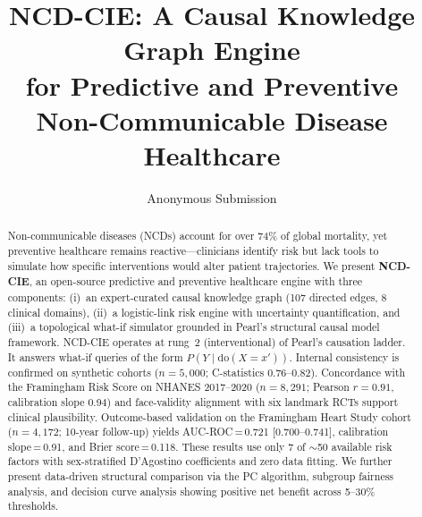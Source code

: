 \documentclass[runningheads]{llncs}
\begin{document}
\title{NCD-CIE: A Causal Knowledge Graph Engine\\for Predictive and Preventive\\Non-Communicable Disease Healthcare}

\author{Anonymous Submission}

\maketitle

\begin{abstract}
Non-communicable diseases (NCDs) account for over 74\% of global
mortality, yet preventive healthcare remains reactive---clinicians
identify risk but lack tools to simulate how specific interventions
would alter patient trajectories.
We present \textbf{NCD-CIE}, an open-source predictive and preventive
healthcare engine with three components:
(i)~an expert-curated causal knowledge graph (107 directed edges,
8 clinical domains),
(ii)~a logistic-link risk engine with uncertainty quantification, and
(iii)~a topological what-if simulator grounded in Pearl's structural
causal model framework.
NCD-CIE operates at rung~2 (interventional) of Pearl's causation
ladder.
It answers what-if queries of the form
$P(Y \mid \mathrm{do}(X\!=\!x'))$.
Internal consistency is confirmed on synthetic cohorts
($n\!=\!5{,}000$; C-statistics 0.76--0.82).
Concordance with the Framingham Risk Score on NHANES 2017--2020
($n\!=\!8{,}291$; Pearson $r\!=\!0.91$, calibration slope 0.94)
and face-validity alignment with six landmark RCTs support clinical
plausibility.
Outcome-based validation on the Framingham Heart Study cohort
($n\!=\!4{,}172$; 10-year follow-up) yields
AUC-ROC\,=\,0.721 [0.700--0.741],
calibration slope\,=\,0.91, and Brier score\,=\,0.118.
These results use only 7 of ${\sim}$50 available risk factors
with sex-stratified D'Agostino coefficients and zero data fitting.
We further present data-driven structural comparison
via the PC algorithm, subgroup fairness analysis, and decision curve
analysis showing positive net benefit across 5--30\% thresholds.

\end{abstract}

\end{document}
